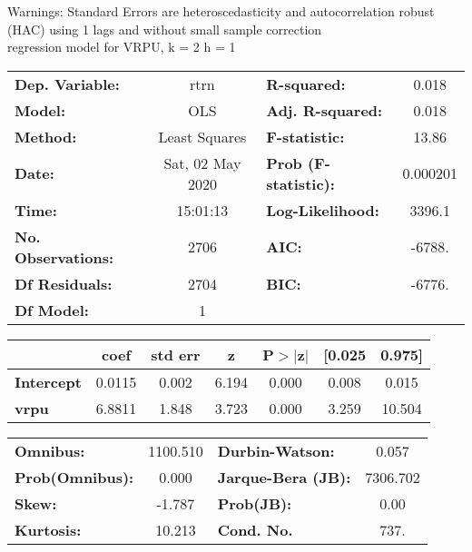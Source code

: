 Warnings: \newline
 [1] Standard Errors are heteroscedasticity and autocorrelation robust (HAC) using 1 lags and without small sample correction\\ 

regression model for VRPU, k = 2 h = 1\begin{center}
\begin{tabular}{lclc}
\toprule
\textbf{Dep. Variable:}    &       rtrn       & \textbf{  R-squared:         } &     0.018   \\
\textbf{Model:}            &       OLS        & \textbf{  Adj. R-squared:    } &     0.018   \\
\textbf{Method:}           &  Least Squares   & \textbf{  F-statistic:       } &     13.86   \\
\textbf{Date:}             & Sat, 02 May 2020 & \textbf{  Prob (F-statistic):} &  0.000201   \\
\textbf{Time:}             &     15:01:13     & \textbf{  Log-Likelihood:    } &    3396.1   \\
\textbf{No. Observations:} &        2706      & \textbf{  AIC:               } &    -6788.   \\
\textbf{Df Residuals:}     &        2704      & \textbf{  BIC:               } &    -6776.   \\
\textbf{Df Model:}         &           1      & \textbf{                     } &             \\
\bottomrule
\end{tabular}
\begin{tabular}{lcccccc}
                   & \textbf{coef} & \textbf{std err} & \textbf{z} & \textbf{P$> |$z$|$} & \textbf{[0.025} & \textbf{0.975]}  \\
\midrule
\textbf{Intercept} &       0.0115  &        0.002     &     6.194  &         0.000        &        0.008    &        0.015     \\
\textbf{vrpu}      &       6.8811  &        1.848     &     3.723  &         0.000        &        3.259    &       10.504     \\
\bottomrule
\end{tabular}
\begin{tabular}{lclc}
\textbf{Omnibus:}       & 1100.510 & \textbf{  Durbin-Watson:     } &    0.057  \\
\textbf{Prob(Omnibus):} &   0.000  & \textbf{  Jarque-Bera (JB):  } & 7306.702  \\
\textbf{Skew:}          &  -1.787  & \textbf{  Prob(JB):          } &     0.00  \\
\textbf{Kurtosis:}      &  10.213  & \textbf{  Cond. No.          } &     737.  \\
\bottomrule
\end{tabular}
\end{center}


